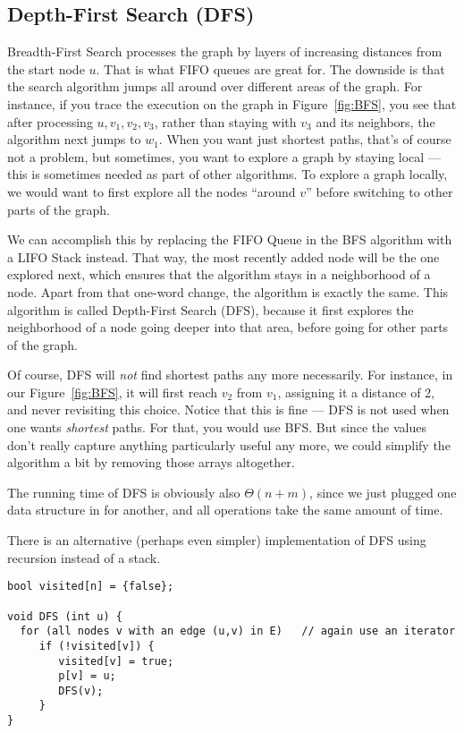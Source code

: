 \subsection{Depth-First Search (DFS)}
Breadth-First Search processes the graph by layers of increasing
distances from the start node $u$. That is what FIFO queues are great
for. The downside is that the search algorithm jumps all around over
different areas of the graph. 
For instance, if you trace the execution on the graph in
Figure~\ref{fig:BFS}, you see that after processing
$u, v_1, v_2, v_3$, rather than staying with $v_3$ and its neighbors,
the algorithm next jumps to $w_1$. 
When you want just shortest paths, that's of course not a problem, but
sometimes, you want to explore a graph by staying local --- this is
sometimes needed as part of other algorithms. 
To explore a graph locally, we would want to first explore all the
nodes ``around $v$'' before switching to other parts of the graph.

We can accomplish this by replacing the FIFO Queue in the BFS
algorithm with a LIFO Stack instead. That way, the most recently added
node will be the one explored next, which ensures that the algorithm
stays in a neighborhood of a node. Apart from that one-word change,
the algorithm is exactly the same. This algorithm is called
Depth-First Search (DFS), because it first explores the neighborhood
of a node going deeper into that area, before going for other parts of
the graph.

Of course, DFS will \emph{not} find shortest paths any more
necessarily. For instance, in our Figure~\ref{fig:BFS}, it will
first reach $v_2$ from $v_1$, assigning it a distance of 2, and never
revisiting this choice. Notice that this is fine --- DFS is not used
when one wants \emph{shortest} paths. For that, you would use BFS.
But since the  values don't really capture anything
particularly useful any more, we could simplify the algorithm a bit by
removing those arrays altogether.

The running time of DFS is obviously also $\Theta(n+m)$, since we just
plugged one data structure in for another, and all operations take the
same amount of time. 

There is an alternative (perhaps even simpler) implementation of DFS
using recursion instead of a stack.

\begin{verbatim}
bool visited[n] = {false};

void DFS (int u) {
  for (all nodes v with an edge (u,v) in E)   // again use an iterator
     if (!visited[v]) {
        visited[v] = true;
        p[v] = u;
        DFS(v);
     }
}
\end{verbatim}

